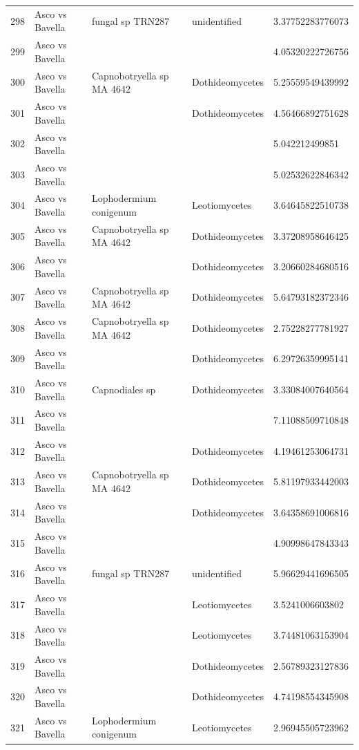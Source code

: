 \documentclass[12pt]{article}\usepackage[]{graphicx}\usepackage[]{color}
\numberwithin{figure}{section}
\begin{document}
\begin{table}[ht]
\begin{tabular}{lllll}
  298 & Asco vs Bavella & fungal sp TRN287 & unidentified & 3.37752283776073 \\ 
  299 & Asco vs Bavella &  &  & 4.05320222726756 \\ 
  300 & Asco vs Bavella & Capnobotryella sp MA 4642 & Dothideomycetes & 5.25559549439992 \\ 
  301 & Asco vs Bavella &  & Dothideomycetes & 4.56466892751628 \\ 
  302 & Asco vs Bavella &  &  & 5.042212499851 \\ 
  303 & Asco vs Bavella &  &  & 5.02532622846342 \\ 
  304 & Asco vs Bavella & Lophodermium conigenum & Leotiomycetes & 3.64645822510738 \\ 
  305 & Asco vs Bavella & Capnobotryella sp MA 4642 & Dothideomycetes & 3.37208958646425 \\ 
  306 & Asco vs Bavella &  & Dothideomycetes & 3.20660284680516 \\ 
  307 & Asco vs Bavella & Capnobotryella sp MA 4642 & Dothideomycetes & 5.64793182372346 \\ 
  308 & Asco vs Bavella & Capnobotryella sp MA 4642 & Dothideomycetes & 2.75228277781927 \\ 
  309 & Asco vs Bavella &  & Dothideomycetes & 6.29726359995141 \\ 
  310 & Asco vs Bavella & Capnodiales sp & Dothideomycetes & 3.33084007640564 \\ 
  311 & Asco vs Bavella &  &  & 7.11088509710848 \\ 
  312 & Asco vs Bavella &  & Dothideomycetes & 4.19461253064731 \\ 
  313 & Asco vs Bavella & Capnobotryella sp MA 4642 & Dothideomycetes & 5.81197933442003 \\ 
  314 & Asco vs Bavella &  & Dothideomycetes & 3.64358691006816 \\ 
  315 & Asco vs Bavella &  &  & 4.90998647843343 \\ 
  316 & Asco vs Bavella & fungal sp TRN287 & unidentified & 5.96629441696505 \\ 
  317 & Asco vs Bavella &  & Leotiomycetes & 3.5241006603802 \\ 
  318 & Asco vs Bavella &  & Leotiomycetes & 3.74481063153904 \\ 
  319 & Asco vs Bavella &  & Dothideomycetes & 2.56789323127836 \\ 
  320 & Asco vs Bavella &  & Dothideomycetes & 4.74198554345908 \\ 
  321 & Asco vs Bavella & Lophodermium conigenum & Leotiomycetes & 2.96945505723962 \\ 

\end{tabular}
\end{table}
\end{document}
